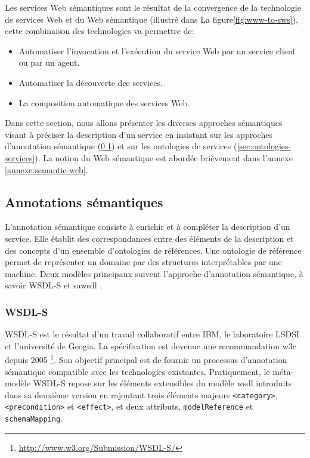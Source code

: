 

Les services Web sémantiques sont le résultat de la convergence de la
technologie de services Web et du Web sémantique (illustré dans La
figure\ref{fig:www-to-sws}), cette combinaison des technologies
va permettre de:

\begin{itemize}\renewcommand\labelitemi{--}
\item Automatiser l'invocation et l'exécution du service Web par un
  service client ou par un agent.

\item Automatiser la découverte dee services.

\item La composition automatique des services Web.
\end{itemize}
\enddescription

Dans cette section, nous allons présenter les diverses approches
sémantiques visant à préciser la description d'un service en insistant
sur les approches d'annotation sémantique
(\ref{sec:semantic-annotation}) et sur les ontologies de services
(\ref{sec:ontologies-services}). La notion du Web sémantique est
abordée brièvement dans l'annexe \ref{annexe:semantic-web}.

  \subsection{Annotations sémantiques}
  \label{sec:semantic-annotation}
  L'annotation sémantique consiste à enrichir et à compléter la
  description d'un service. Elle établit des correspondances entre des
  éléments de la description et des concepts d'un ensemble
  d'ontologies de références. Une ontologie de référence permet de
  représenter un domaine par des structures interprétables par une
  machine. Deux modèles principaux suivent l'approche d'annotation
  sémantique, à savoir \textsc{WSDL-S} et \acrshort{sawsdl}
  \cite{elie2010}.

    \subsubsection{WSDL-S}
    \textsc{WSDL-S} \cite{akkiraju2005web} est le résultat d'un
    travail collaboratif entre IBM, le laboratoire LSDSI et
    l'université de Geogia. La spécification est devenue une
    recommandation \acrshort{w3c} depuis 2005
    \footnote{\url{http://www.w3.org/Submission/WSDL-S/}}. Son
    objectif principal est de fournir un processus d'annotation
    sémantique compatible avec les technologies
    existantes. Pratiquement, le méta-modèle \textsc{WSDL-S} repose
    sur les éléments extensibles du modèle \acrshort{wsdl} introduits
    dans sa deuxième version en rajoutant trois éléments majeurs
    \texttt{<category>}, \texttt{<precondition>} et \texttt{<effect>},
    et deux attributs, \texttt{modelReference} et
    \texttt{schemaMapping}.\medskip

